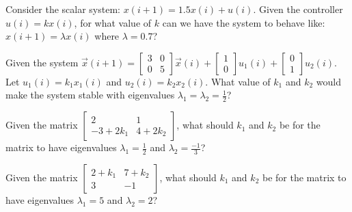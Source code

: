    
\begin{enumerate}

\qitem Consider the scalar system: $x(i+1) = 1.5 x(i) + u(i)$. Given the controller $u(i) = k x(i)$, for what value of $k$ can we have the system to behave like:$x(i+1) = \lambda x(i)$ where $\lambda = 0.7$?



\qitem Given the system $\vec{x}(i+1)  = \left [ \begin{array}{cc} 3&0\\0&5 \end{array}\right] \vec{x}(i) + \left[\begin{array}{c}1\\0 \end{array}\right] u_1(i)+ \left[\begin{array}{c}0\\1 \end{array}\right] u_2(i)$.
Let $u_1(i) = k_1 x_1(i)$ and $u_2(i) = k_2 x_2(i)$. What value of $k_1$ and $k_2$ would make the system stable with eigenvalues $\lambda_1 = \lambda_2 = \frac{1}{2}$?











\qitem Given the matrix $\begin{bmatrix}
2  & 1 \\
-3 + 2k_1 & 4+2k_2
\end{bmatrix}$,
what should $k_1$ and $k_2$ be for the matrix to have eigenvalues $\lambda_1=\frac{1}{2}$ and $\lambda_2=\frac{-1}{3}$?







\qitem Given the matrix $\begin{bmatrix}
2+ k_1  & 7 +k_2 \\
3 & -1
\end{bmatrix}$,
what should $k_1$ and $k_2$ be for the matrix to have eigenvalues $\lambda_1=5$ and $\lambda_2=2$?









\end{enumerate}
